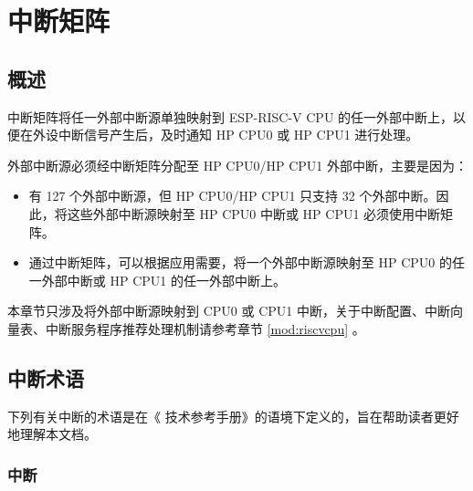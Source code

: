 \documentclass[main\_\_CN.tex]{subfiles}
\begin{document}

\ifglobal
\else
    \listoftodos
    {\let\clearpage\relax \listofdonetodos}
    \tableofcontents
\fi



\hypertarget{intmtrx}{}
\chapter{中断矩阵}
\label{mod:intmtrx}

\section{概述}


\chipname{} 中断矩阵将任一外部中断源单独映射到 ESP-RISC-V CPU 的任一外部中断上，以便在外设中断信号产生后，及时通知 HP CPU0 或 HP CPU1 进行处理。

外部中断源必须经中断矩阵分配至 HP CPU0/HP CPU1 外部中断，主要是因为：
\begin{itemize}
    \item \chipname{} 有 127 个外部中断源，但 HP CPU0/HP CPU1 只支持 32 个外部中断。因此，将这些外部中断源映射至 HP CPU0 中断或 HP CPU1 必须使用中断矩阵。
    \item 通过中断矩阵，可以根据应用需要，将一个外部中断源映射至 HP CPU0 的任一外部中断或 HP CPU1 的任一外部中断上。
\end{itemize}

\begin{tiplisting}
本章节只涉及将外部中断源映射到 CPU0 或 CPU1 中断，关于中断配置、中断向量表、中断服务程序推荐处理机制请参考章节 \ref{mod:riscvcpu} \textit{}。
\end{tiplisting}
\vspace{-1em}

\section{\chipname{} 中断术语}\label{sec:intmtx-int-terminology}

下列有关中断的术语是在《\chipname{} 技术参考手册》的语境下定义的，旨在帮助读者更好地理解本文档。

\subsection{中断}
\end{document}
